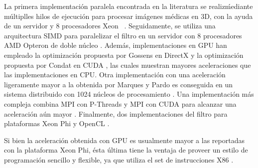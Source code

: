 La primera implementaci\'on paralela encontrada en la literatura se realiz\' mediante m\'ultiplles hilos de ejecuci\'on para procesar im\'agenes m\'edicas en 3D, con la ayuda de un servidor y 8 procesadores Xeon \ \cite{coupe2006fast}. Seguidamente, se utiliza una arquitectura SIMD para paralelizar el filtro en un servidor con 8 procesadores AMD Opteron de doble n\'ucleo \cite{Darbon2008}. Adem\'as, implementaciones en GPU han empleado la optimizaci\'on propuesta por Gossens en DirectX \cite{marques2013implementation} y la optimizaci\'on propuesta por Condat en CUDA \cite{mingliang2016medical,goossens2010gpu}, las cuales muestran mayores aceleraciones que las implementaciones en CPU. Otra implementaci\'on con una aceleraci\'on ligeramente mayor a la obtenida por Marques y Pardo \cite{marques2013implementation} es conseguida en un sistema distribuido con 1024 n\'ucleos de procesamiento \cite{shi2015optimized}. Una implementaci\'on m\'as compleja combina MPI con P-Threads y MPI con CUDA para alcanzar una aceleraci\'on a\'un mayor \cite{nguyen2016medical}. Finalmente, dos implementaciones del filtro para plataformas Xeon Phi \cite{zhu2016parallel,huang2017parallel} y OpenCL \cite{zhu2016parallel}.

Si bien la aceleraci\'on obtenida con GPU es usualmente mayor a las reportadas con la plataforma Xeon Phi, \'esta \'ultima tiene la ventaja de proveer un estilo de programaci\'on sencillo y flexible, ya que utiliza el set de instrucciones X86 \cite{huang2017parallel}. 